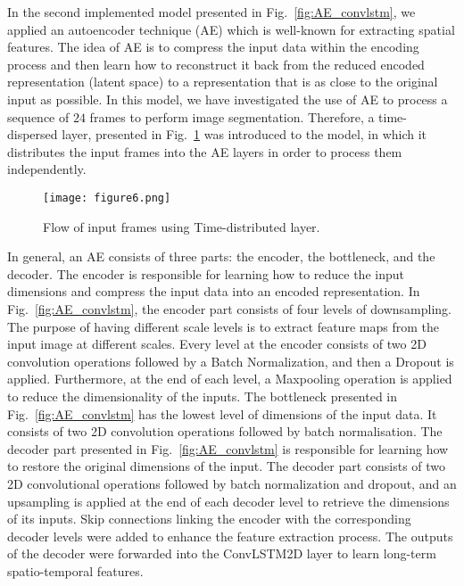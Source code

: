 In the second implemented model presented in Fig.~\ref{fig:AE_convlstm}, we applied an autoencoder technique (AE) which is well-known for extracting spatial features.
The idea of AE is to compress the input data within the encoding process and then learn how to reconstruct it back from the reduced encoded representation (latent space) to a representation that is as close to the original input as possible. 
In this model, we have investigated the use of AE to process a sequence of \(24\) frames to perform image segmentation.
Therefore, a time-dispersed layer, presented in Fig.~\ref{fig:TD} was introduced to the model, in which it distributes the input frames into the AE layers in order to process them independently.
\begin{figure}[!h]
	\centering
	\texttt{[image: figure6.png]}
	\caption{Flow of input frames using Time-distributed layer.}
	\label{fig:TD}
\end{figure}

In general, an AE consists of three parts: the encoder, the bottleneck, and the decoder.
The encoder is responsible for learning how to reduce the input dimensions and compress the input data into an encoded representation.
In Fig.~\ref{fig:AE_convlstm}, the encoder part consists of four levels of downsampling. 
The purpose of having different scale levels is to extract feature maps from the input image at different scales.
Every level at the encoder consists of two 2D convolution operations followed by a Batch Normalization, and then a Dropout is applied.
Furthermore, at the end of each level, a Maxpooling operation is applied to reduce the dimensionality of the inputs. 
The bottleneck presented in Fig.~\ref{fig:AE_convlstm} has the lowest level of dimensions of the input data.
It consists of two 2D convolution operations followed by batch normalisation.
The decoder part presented in Fig.~\ref{fig:AE_convlstm} is responsible for learning how to restore the original dimensions of the input.
The decoder part consists of two 2D convolutional operations followed by batch normalization and dropout, and an upsampling is applied at the end of each decoder level to retrieve the dimensions of its inputs.
Skip connections linking the encoder with the corresponding decoder levels were added to enhance the feature extraction process.
The outputs of the decoder were forwarded into the ConvLSTM2D layer to learn long-term spatio-temporal features.

